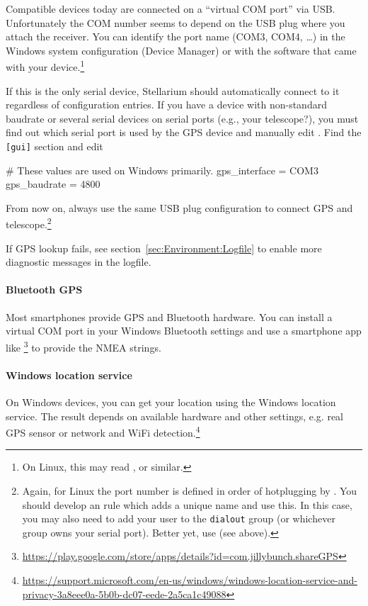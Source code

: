 Compatible devices today are connected on a ``virtual COM port'' via
USB. Unfortunately the COM number seems to depend on the USB plug
where you attach the receiver.  You can identify the port name (COM3,
COM4, \ldots) in the Windows system configuration (Device Manager) or
with the software that came with your device.\footnote{On Linux, this
  may read ,  or similar.}

If this is the only serial device, Stellarium should automatically
connect to it regardless of configuration entries.  If you
have a device with non-standard baudrate or several serial devices on
serial ports (e.g., your telescope?), you must find out which serial port is
used by the GPS device and manually edit .  Find
the \texttt{[gui]} section and edit
\begin{configfile}
[gui]
# These values are used on Windows primarily.
gps_interface     = COM3
gps_baudrate      = 4800
\end{configfile}
From now on, always use the same USB plug configuration to connect GPS
and telescope.\footnote{Again, for Linux the port number is defined in
  order of hotplugging by . You should develop an
   rule which adds a unique name and use this. In this
  case, you may also need to add your user to the \texttt{dialout}
  group (or whichever group owns your serial port).  Better yet, use
   (see above).}

If GPS lookup fails, see section~\ref{sec:Environment:Logfile} to enable more diagnostic messages in the logfile.

\paragraph{Bluetooth GPS} Most smartphones provide GPS and Bluetooth
hardware. You can install a virtual COM port in your Windows Bluetooth
settings and use a smartphone app like \footnote{\url{https://play.google.com/store/apps/details?id=com.jillybunch.shareGPS}}
to provide the NMEA strings.

\paragraph{Windows location service} On Windows devices, you can get your location
using the Windows location service. The result depends on available
hardware and other settings, e.g. real GPS sensor or network and WiFi
detection.\footnote{\url{https://support.microsoft.com/en-us/windows/windows-location-service-and-privacy-3a8eee0a-5b0b-dc07-eede-2a5ca1c49088}}


